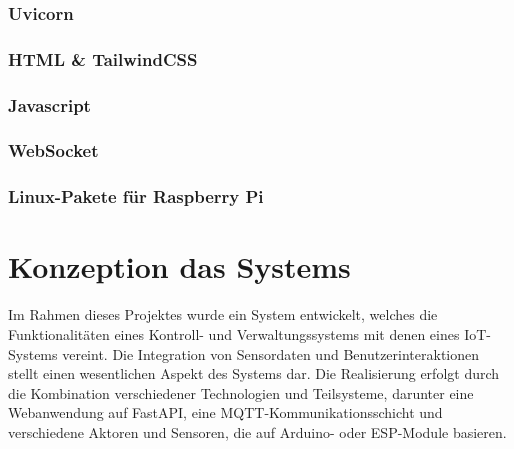 \documentclass[12pt, letterpaper]{article}
\begin{document}
    \subsubsection{Uvicorn}
    \subsubsection{HTML \& TailwindCSS}
    \subsubsection{Javascript}
    \subsubsection{WebSocket}
    \subsubsection{Linux-Pakete für Raspberry Pi}

\newpage
\section{Konzeption das Systems}
\par Im Rahmen dieses Projektes wurde ein System entwickelt, welches die Funktionalitäten eines Kontroll- und Verwaltungssystems mit denen eines IoT-Systems vereint. Die Integration von Sensordaten und Benutzerinteraktionen stellt einen wesentlichen Aspekt des Systems dar. Die Realisierung erfolgt durch die Kombination verschiedener Technologien und Teilsysteme, darunter eine Webanwendung auf FastAPI, eine MQTT-Kommunikationsschicht und verschiedene Aktoren und Sensoren, die auf Arduino- oder ESP-Module basieren.
\end{document}
